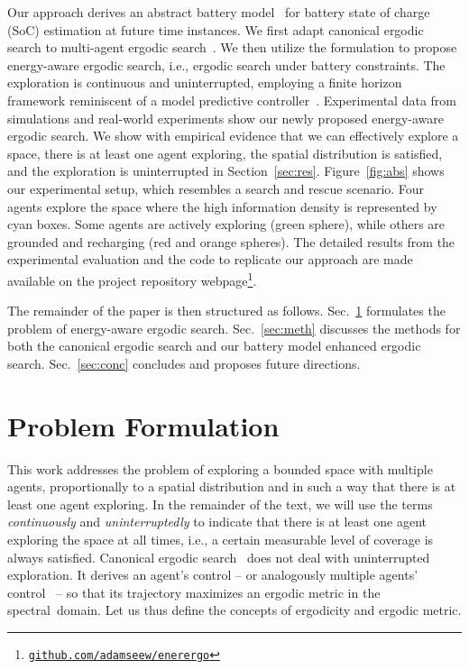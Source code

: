 \documentclass[letterpaper,10pt,conference,twoside]{IEEEtran}
\theoremstyle{definition}
\begin{document}
Our approach derives an abstract battery model~\cite{zhao2017observability} for battery state of charge (SoC) estimation at future time instances. We first adapt canonical ergodic search to multi-agent ergodic search~\cite{prabhakar2020ergodic,coffin2022multi}. We then utilize the formulation to propose energy-aware ergodic search, i.e., ergodic search under battery constraints. The exploration is continuous and uninterrupted, employing a finite horizon framework reminiscent of a model predictive controller~\cite{seewald2022energy}. %
%
Experimental data from simulations and real-world experiments show %
our newly proposed energy-aware ergodic search. 
We show with empirical evidence that we can effectively explore a space, %
there is %
at least one agent exploring, the spatial distribution is satisfied, and the exploration is %
uninterrupted in Section~\ref{sec:res}. 
Figure~\ref{fig:abs} shows our experimental setup, which resembles a search and rescue scenario. Four agents explore the space where the high information density is represented by cyan boxes. Some agents are actively exploring (green sphere), while others are grounded and recharging (red and orange spheres). 
The detailed results from the experimental evaluation and the code to replicate our approach are made available on the project repository webpage\footnote{\label{reflink}{\tt\footnotesize\href{https://github.com/adamseew/enerergo}{github.com/adamseew/enerergo}}}.

The remainder of the paper is then structured as follows. Sec.~\ref{sec:pb} formulates the problem of energy-aware ergodic search. Sec.~\ref{sec:meth} discusses the methods for both the canonical ergodic search and our battery model enhanced ergodic search. Sec.~\ref{sec:conc} concludes and proposes future directions.


\section{Problem Formulation}\label{sec:pb}
\noindent
This work addresses the problem of exploring a bounded space with multiple agents, proportionally to a spatial distribution and in such a way that there is at least one agent exploring. 
%
In the remainder of the text, we will use the terms \textit{continuously} and \textit{uninterruptedly} to indicate that there is at least one agent exploring the space at all times, i.e., a certain measurable level of coverage is always satisfied. 
%
Canonical ergodic search~\cite{mathew2011metrics,miller2013trajectory,abraham2021ergodic,miller2016ergodic,dressel2018optimality,torre2016ergodic,shetty2022ergodic} does not deal with uninterrupted exploration. It derives an agent's control -- or analogously multiple agents' control~\cite{prabhakar2020ergodic,coffin2022multi,lerch2023safety,abraham2018decentralized,patel2021multi} -- so that its trajectory maximizes an ergodic metric %
in the spectral~domain. %
%
Let us thus define the concepts of ergodicity and ergodic metric.
\end{document}
